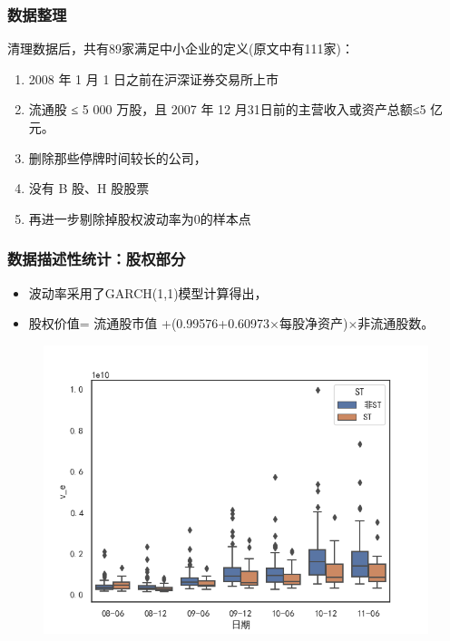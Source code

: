 \documentclass{ctexbeamer}
\begin{document}
\begin{frame}
    \frametitle{数据整理}
    清理数据后，共有89家满足\citet{彭伟2012基于}中小企业的定义(原文中有111家)：
    \begin{enumerate}
        \item 2008 年 1 月 1 日之前在沪深证券交易所上市
        \item 流通股 ≤ 5 000 万股，且 2007 年 12 月31日前的主营收入或资产总额≤5 亿元。
        \item 删除那些停牌时间较长的公司，
        \item 没有 B 股、H 股股票
        \item 再进一步剔除掉股权波动率为0的样本点
    \end{enumerate}
\end{frame}

\begin{frame}
    \frametitle{数据描述性统计：股权部分}
    \begin{itemize}
        \item 波动率采用了GARCH(1,1)模型计算得出，
        \item 股权价值= 流通股市值 +(0.99576+0.60973$\times$每股净资产)$\times$非流通股数。
    \end{itemize}
    \begin{figure}
        \begin{minipage}{0.48\linewidth}
            \includegraphics[width=\textwidth]{img/v_e.png}
        \end{minipage}
        \begin{minipage}{0.48\linewidth}

\end{minipage}
\end{figure}
\end{frame}
\end{document}
